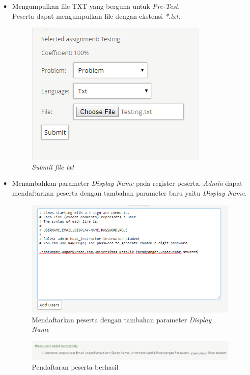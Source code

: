\documentclass[a4paper,twoside]{article}
\begin{document}
\begin{enumerate}
\begin{itemize}
			\item Mengumpulkan file TXT yang berguna untuk \textit{Pre-Test}. \\
			Peserta dapat mengumpulkan file dengan ekstensi \textit{*.txt}.
			\begin{figure}[H]
				\centering  
				\includegraphics[scale=0.5]{submit_txt}  
				\caption[\textit{Submit file txt}]{\textit{Submit file txt}} 
				\label{fig:submittxt} 
			\end{figure} 
			
			\pagebreak
			\item Menambahkan parameter \textit{Display Name} pada register peserta.
			\textit{Admin} dapat mendaftarkan peserta dengan tambahan parameter baru yaitu \textit{Display Name}.
			\begin{figure}[H]
				\centering  
				\includegraphics[scale=0.5]{insert_user}  
				\caption[Mendaftarkan peserta dengan tambahan parameter \textit{Display Name}]{Mendaftarkan peserta dengan tambahan parameter \textit{Display Name}} 
			\label{fig:insertuser} 
			\end{figure} 
		
			\begin{figure}[H]
				\centering  
				\includegraphics[scale=0.6]{insert_success}  
				\caption[Pendaftaran peserta berhasil]{Pendaftaran peserta berhasil} 
			\label{fig:successinsert} 
			\end{figure} 
			

\end{itemize}
\end{enumerate}
\end{document}
